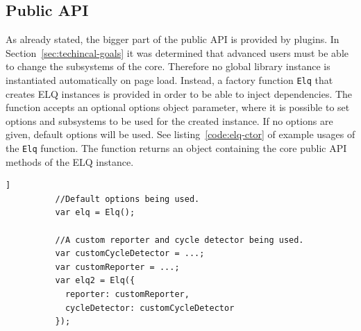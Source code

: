 \documentclass[a4paper,11pt]{kth-mag}
\newcommand{\code}[1]{\texttt{#1}}
\begin{document}
      \subsection{Public API}\label{sec:public-api}
        As already stated, the bigger part of the public \gls{API} is provided by plugins.
        In Section~\ref{sec:techincal-goals} it was determined that advanced users must be able to change the subsystems of the core.
        Therefore no global library instance is instantiated automatically on page load.
        Instead, a factory function \code{Elq} that creates \gls{ELQ} instances is provided in order to be able to inject dependencies.
        The function accepts an optional options object parameter, where it is possible to set options and subsystems to be used for the created instance.
        If no options are given, default options will be used.
        See listing~\ref{code:elq-ctor} of example usages of the \code{Elq} function.
        The function returns an object containing the core public \gls{API} methods of the \gls{ELQ} instance.
        \begin{lstlisting}[gobble=10,caption={Example usages of the \code{Elq} factory function that creates \gls{ELQ} instances.},captionpos=b,label={code:elq-ctor}]]
          //Default options being used.
          var elq = Elq();

          //A custom reporter and cycle detector being used.
          var customCycleDetector = ...;
          var customReporter = ...;
          var elq2 = Elq({
            reporter: customReporter,
            cycleDetector: customCycleDetector
          });
        \end{lstlisting}
\end{document}
